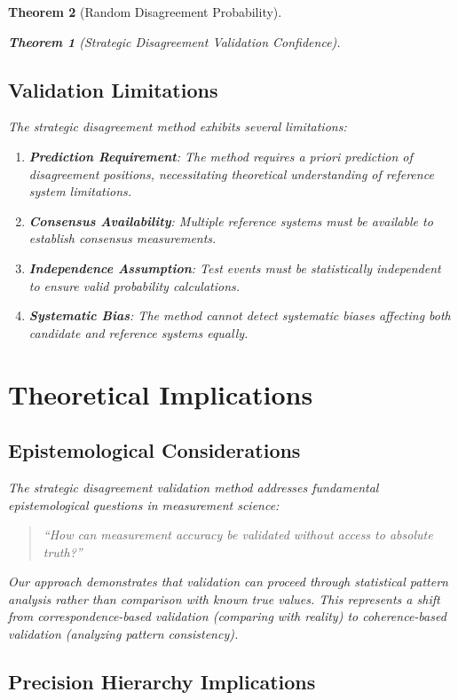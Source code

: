 \documentclass[12pt,a4paper]{article}
\newtheorem{theorem}{Theorem}
\begin{document}
\begin{theorem}[Random Disagreement Probability]
\begin{theorem}[Strategic Disagreement Validation Confidence]
\subsection{Validation Limitations}

The strategic disagreement method exhibits several limitations:

\begin{enumerate}
\item \textbf{Prediction Requirement}: The method requires a priori prediction of disagreement positions, necessitating theoretical understanding of reference system limitations.

\item \textbf{Consensus Availability}: Multiple reference systems must be available to establish consensus measurements.

\item \textbf{Independence Assumption}: Test events must be statistically independent to ensure valid probability calculations.

\item \textbf{Systematic Bias}: The method cannot detect systematic biases affecting both candidate and reference systems equally.
\end{enumerate}

\section{Theoretical Implications}

\subsection{Epistemological Considerations}

The strategic disagreement validation method addresses fundamental epistemological questions in measurement science:

\begin{quote}
``How can measurement accuracy be validated without access to absolute truth?''
\end{quote}

Our approach demonstrates that validation can proceed through statistical pattern analysis rather than comparison with known true values. This represents a shift from \textit{correspondence-based} validation (comparing with reality) to \textit{coherence-based} validation (analyzing pattern consistency).

\subsection{Precision Hierarchy Implications}


\end{theorem}
\end{theorem}
\end{document}
